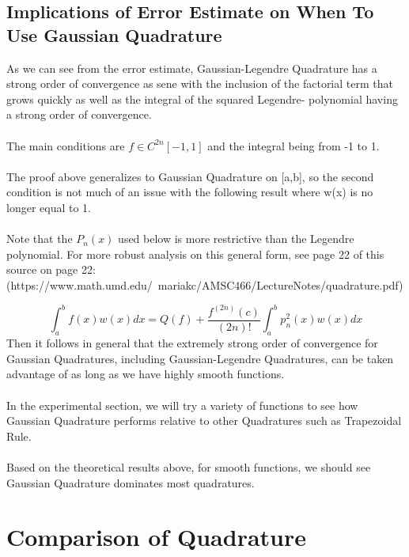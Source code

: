 \documentclass[12pt]{article}
\begin{document}
\subsection{Implications of Error Estimate on When To Use Gaussian Quadrature}
As we can see from the error estimate, Gaussian-Legendre Quadrature has a strong order of convergence as sene with the inclusion of the factorial term that grows quickly as well as the integral of the squared Legendre- polynomial having a strong order of convergence. 
\\
\\
The main conditions are $f \in C^{2n}[-1,1]$ and the integral being from -1 to 1.
\\
\\
The proof above generalizes to Gaussian Quadrature on [a,b], so the second condition is not much of an issue with the following result where w(x) is no longer equal to 1.
\\
\\
Note that the $P_n(x)$ used below is more restrictive than the Legendre polynomial. For more robust analysis on this general form, see page 22 of this source on page 22:
\\
(https://www.math.umd.edu/~mariakc/AMSC466/LectureNotes/quadrature.pdf)

\begin{equation}
    \int_a^b f(x)w(x)dx = Q(f) + \frac{f^{(2n)}(c)}{(2n)!} \int_a^b p_n^2(x)w(x)dx
\end{equation}
Then it follows in general that the extremely strong order of convergence for Gaussian Quadratures, including Gaussian-Legendre Quadratures, can be taken advantage of as long as we have highly smooth functions.
\\
\\
In the experimental section, we will try a variety of functions to see how Gaussian Quadrature performs relative to other Quadratures such as Trapezoidal Rule.
\\
\\
Based on the theoretical results above, for smooth functions, we should see Gaussian Quadrature dominates most quadratures.


\section{Comparison of Quadrature}

\end{document}
